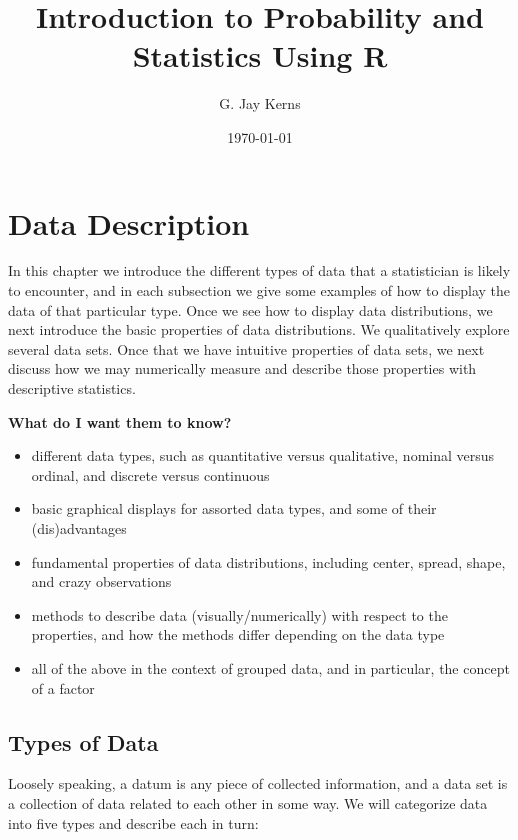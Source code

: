 \documentclass[10pt,english]{scrbook}
\author{G. Jay Kerns}
\date{\today}
\title{Introduction to Probability and Statistics Using R}
\begin{document}
\maketitle
\setcounter{tocdepth}{3}
\tableofcontents




\chapter[Data Description]{Data Description}
\label{sec-1}

\noindent
In this chapter we introduce the different types of data that a statistician is likely to encounter, and in each subsection we give some examples of how to display the data of that particular type. Once we see how to display data distributions, we next introduce the basic properties of data distributions. We qualitatively explore several data sets. Once that we have intuitive properties of data sets, we next discuss how we may numerically measure and describe those properties with descriptive statistics.

\textbf{What do I want them to know?}

\begin{itemize}
\item different data types, such as quantitative versus qualitative, nominal versus ordinal, and discrete versus continuous
\item basic graphical displays for assorted data types, and some of their (dis)advantages
\item fundamental properties of data distributions, including center, spread, shape, and crazy observations
\item methods to describe data (visually/numerically) with respect to the properties, and how the methods differ depending on the data type
\item all of the above in the context of grouped data, and in particular, the concept of a factor
\end{itemize}

\section[Types of Data]{Types of Data}
\label{sec-1-1}

Loosely speaking, a datum is any piece of collected information, and a data set is a collection of data related to each other in some way. We will categorize data into five types and describe each in turn:
\end{document}
